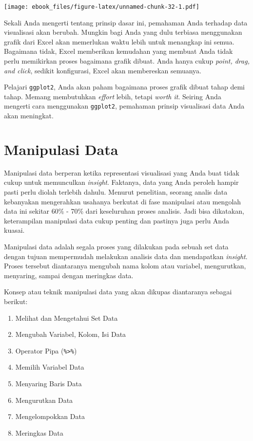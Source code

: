 \documentclass[openany]{book}
\providecommand{\tightlist}{%
  \setlength{\itemsep}{0pt}\setlength{\parskip}{0pt}}
\begin{document}
\texttt{[image: ebook\_files/figure-latex/unnamed-chunk-32-1.pdf]}

Sekali Anda mengerti tentang prinsip dasar ini, pemahaman Anda terhadap
data visualisasi akan berubah. Mungkin bagi Anda yang dulu terbiasa
menggunakan grafik dari Excel akan memerlukan waktu lebih untuk
menangkap ini semua. Bagaimana tidak, Excel memberikan kemudahan yang
membuat Anda tidak perlu memikirkan proses bagaimana grafik dibuat. Anda
hanya cukup \emph{point, drag, and click}, sedikit konfigurasi, Excel
akan membereskan semuanya.

Pelajari \texttt{ggplot2}, Anda akan paham bagaimana proses grafik
dibuat tahap demi tahap. Memang membutuhkan \emph{effort} lebih, tetapi
\emph{worth it}. Seiring Anda mengerti cara menggunakan
\texttt{ggplot2}, pemahaman prinsip visualisasi data Anda akan
meningkat.

\section{Manipulasi Data}\label{manipulasi-data}

Manipulasi data berperan ketika representasi visualisasi yang Anda buat
tidak cukup untuk memunculkan \emph{insight}. Faktanya, data yang Anda
peroleh hampir pasti perlu diolah terlebih dahulu. Menurut penelitian,
seorang analis data kebanyakan mengerahkan usahanya berkutat di fase
manipulasi atau mengolah data ini sekitar 60\% - 70\% dari keseluruhan
proses analisis. Jadi bisa dikatakan, keterampilan manipulasi data cukup
penting dan pastinya juga perlu Anda kuasai.

Manipulasi data adalah segala proses yang dilakukan pada sebuah set data
dengan tujuan mempermudah melakukan analisis data dan mendapatkan
\emph{insight}. Proses tersebut diantaranya mengubah nama kolom atau
variabel, mengurutkan, menyaring, sampai dengan meringkas data.

Konsep atau teknik manipulasi data yang akan dikupas diantaranya sebagai
berikut:

\begin{enumerate}
\def\labelenumi{\arabic{enumi}.}
\tightlist
\item
  Melihat dan Mengetahui Set Data
\item
  Mengubah Variabel, Kolom, Isi Data
\item
  Operator Pipa (\texttt{\%\textgreater{}\%})
\item
  Memilih Variabel Data
\item
  Menyaring Baris Data
\item
  Mengurutkan Data
\item
  Mengelompokkan Data
\item
  Meringkas Data
\end{enumerate}
\end{document}
